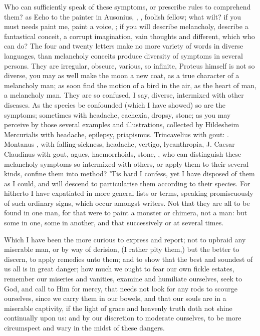 {Who can sufficiently speak of these symptoms, or prescribe rules to comprehend
them? as Echo to the painter in Ausonius, , \etc{},
foolish fellow; what wilt? if you must needs paint me, paint a voice, ; if you will describe melancholy, describe
a fantastical conceit, a corrupt imagination, vain thoughts and different,
which who can do? The four and twenty letters make no more variety of words in
diverse languages, than melancholy conceits produce diversity of symptoms in
several persons. They are irregular, obscure, various, so infinite, Proteus
himself is not so diverse, you may as well make the moon a new coat, as a true
character of a melancholy man; as soon find the motion of a bird in the air, as
the heart of man, a melancholy man. They are so confused, I say, diverse,
intermixed with other diseases. As the species be confounded (which
I have showed) so are the symptoms; sometimes with
headache, cachexia, dropsy, stone; as you may perceive by those several
examples and illustrations, collected by Hildesheim
 Mercurialis  with headache, epilepsy, priapismus. Trincavelius
 with gout: . Montanus ,
with falling-sickness, headache, vertigo, lycanthropia, \etc{} J. Caesar
Claudinus  with gout,
agues, haemorrhoids, stone, \etc{}, who can distinguish these melancholy
symptoms so intermixed with others, or apply them to their several kinds,
confine them into method? 'Tis hard I confess, yet I have disposed of them as I
could, and will descend to particularise them according to their species. For
hitherto I have expatiated in more general lists or terms, speaking
promiscuously of such ordinary signs, which occur amongst writers. Not that
they are all to be found in one man, for that were to paint a monster or
chimera, not a man: but some in one, some in another, and that successively or
at several times.

Which I have been the more curious to express and report; not to upbraid any
miserable man, or by way of derision, (I rather pity them,) but the better to
discern, to apply remedies unto them; and to show that the best and soundest of
us all is in great danger; how much we ought to fear our own fickle estates,
remember our miseries and vanities, examine and humiliate ourselves, seek to
God, and call to Him for mercy, that needs not look for any rods to scourge
ourselves, since we carry them in our bowels, and that our souls are in a
miserable captivity, if the light of grace and heavenly truth doth not shine
continually upon us: and by our discretion to moderate ourselves, to be more
circumspect and wary in the midst of these dangers.

}
